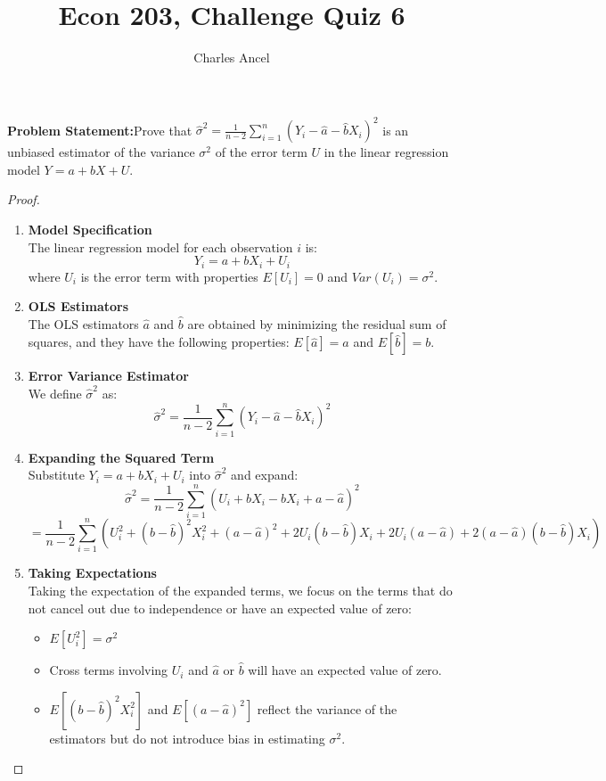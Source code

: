 \documentclass[12pt]{amsart}
\title{Econ 203, Challenge Quiz 6}
\author{Charles Ancel}
\theoremstyle{definition}
\numberwithin{equation}{section}
\theoremstyle{plain}
\begin{document}
\maketitle

\textbf{Problem Statement:}Prove that \(\hat{\sigma}^2 = \frac{1}{n-2} \sum_{i=1}^n (Y_i - \hat{a} - \hat{b}X_i)^2\) is an unbiased estimator of the variance \(\sigma^2\) of the error term \(U\) in the linear regression model \(Y = a + bX + U\).


\begin{proof}
    \begin{enumerate}[label=Step \arabic*:]
        \item \textbf{Model Specification}\\ 
        The linear regression model for each observation \(i\) is:  
        \[ Y_i = a + bX_i + U_i \]  
        where \(U_i\) is the error term with properties \(E[U_i] = 0\) and \(Var(U_i) = \sigma^2\).
        
        \item \textbf{OLS Estimators}\\
        The OLS estimators \(\hat{a}\) and \(\hat{b}\) are obtained by minimizing the residual sum of squares, and they have the following properties: \(E[\hat{a}] = a\) and \(E[\hat{b}] = b\).
        
        \item \textbf{Error Variance Estimator}\\  
        We define \(\hat{\sigma}^2\) as:  
        \[ \hat{\sigma}^2 = \frac{1}{n-2} \sum_{i=1}^n (Y_i - \hat{a} - \hat{b}X_i)^2 \]
        
        \item \textbf{Expanding the Squared Term}\\  
        Substitute \(Y_i = a + bX_i + U_i\) into \(\hat{\sigma}^2\) and expand:  
        \[ \hat{\sigma}^2 = \frac{1}{n-2} \sum_{i=1}^n (U_i + bX_i - \hat{b}X_i + a - \hat{a})^2 \]  
        \[ = \frac{1}{n-2} \sum_{i=1}^n (U_i^2 + (b - \hat{b})^2 X_i^2 + (a - \hat{a})^2 + 2U_i(b - \hat{b})X_i + 2U_i(a - \hat{a}) + 2(a - \hat{a})(b - \hat{b})X_i) \]
        
        \item \textbf{Taking Expectations}\\  
        Taking the expectation of the expanded terms, we focus on the terms that do not cancel out due to independence or have an expected value of zero:  
        \begin{itemize}
            \item \(E[U_i^2] = \sigma^2\)
            \item Cross terms involving \(U_i\) and \(\hat{a}\) or \(\hat{b}\) will have an expected value of zero.
            \item \(E[(b - \hat{b})^2 X_i^2]\) and \(E[(a - \hat{a})^2]\) reflect the variance of the estimators but do not introduce bias in estimating \(\sigma^2\).
        \end{itemize}
        

\end{enumerate}
\end{proof}
\end{document}
